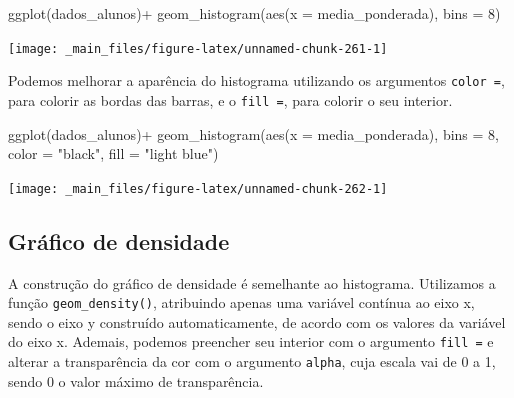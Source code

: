 \documentclass[
  brazilian,
]{book}
\newenvironment{Shaded}{\begin{snugshade}}{\end{snugshade}}
\newcommand{\AttributeTok}[1]{\textcolor[rgb]{0.77,0.63,0.00}{#1}}
\newcommand{\DecValTok}[1]{\textcolor[rgb]{0.00,0.00,0.81}{#1}}
\newcommand{\FunctionTok}[1]{\textcolor[rgb]{0.00,0.00,0.00}{#1}}
\newcommand{\NormalTok}[1]{#1}
\newcommand{\SpecialCharTok}[1]{\textcolor[rgb]{0.00,0.00,0.00}{#1}}
\newcommand{\StringTok}[1]{\textcolor[rgb]{0.31,0.60,0.02}{#1}}
\begin{document}
\begin{Shaded}
\begin{Highlighting}[]
\FunctionTok{ggplot}\NormalTok{(dados\_alunos)}\SpecialCharTok{+}
  \FunctionTok{geom\_histogram}\NormalTok{(}\FunctionTok{aes}\NormalTok{(}\AttributeTok{x =}\NormalTok{ media\_ponderada),}
                 \AttributeTok{bins =} \DecValTok{8}\NormalTok{)}
\end{Highlighting}
\end{Shaded}

\begin{center}\texttt{[image: \_main\_files/figure-latex/unnamed-chunk-261-1]} \end{center}

Podemos melhorar a aparência do histograma utilizando os argumentos \texttt{color\ =}, para colorir as bordas das barras, e o \texttt{fill\ =}, para colorir o seu interior.

\begin{Shaded}
\begin{Highlighting}[]
\FunctionTok{ggplot}\NormalTok{(dados\_alunos)}\SpecialCharTok{+}
  \FunctionTok{geom\_histogram}\NormalTok{(}\FunctionTok{aes}\NormalTok{(}\AttributeTok{x =}\NormalTok{ media\_ponderada),}
                 \AttributeTok{bins =} \DecValTok{8}\NormalTok{, }
                 \AttributeTok{color =} \StringTok{"black"}\NormalTok{,}
                 \AttributeTok{fill =} \StringTok{"light blue"}\NormalTok{)}
\end{Highlighting}
\end{Shaded}

\begin{center}\texttt{[image: \_main\_files/figure-latex/unnamed-chunk-262-1]} \end{center}

\hypertarget{gruxe1fico-de-densidade}{%
\subsection{Gráfico de densidade}\label{gruxe1fico-de-densidade}}

A construção do gráfico de densidade é semelhante ao histograma. Utilizamos a função \texttt{geom\_density()}, atribuindo apenas uma variável contínua ao eixo x, sendo o eixo y construído automaticamente, de acordo com os valores da variável do eixo x. Ademais, podemos preencher seu interior com o argumento \texttt{fill\ =} e alterar a transparência da cor com o argumento \texttt{alpha}, cuja escala vai de 0 a 1, sendo 0 o valor máximo de transparência.
\end{document}
